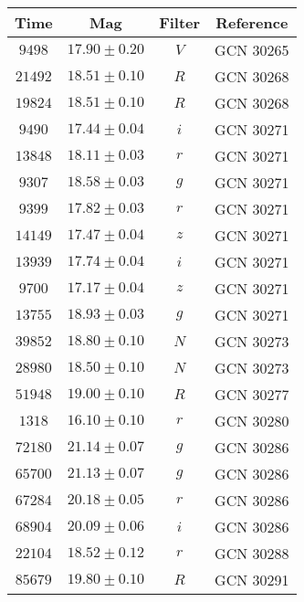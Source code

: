 \documentclass{naturesubmissionstyle}
\begin{document}

\begin{table}
\centering
\begin{tabular}{cccc}

Time & Mag & Filter & Reference \\
\hline
$9498$ & $17.90\pm0.20$ & $V$ & GCN 30265\cite{gcn_30265} \\
$21492$ & $18.51\pm0.10$ & $R$ & GCN 30268\cite{gcn_30268} \\
$19824$ & $18.51\pm0.10$ & $R$ & GCN 30268\cite{gcn_30268} \\
$9490$ & $17.44\pm0.04$ & $i$ & GCN 30271\cite{gcn_30271} \\
$13848$ & $18.11\pm0.03$ & $r$ & GCN 30271\cite{gcn_30271} \\
$9307$ & $18.58\pm0.03$ & $g$ & GCN 30271\cite{gcn_30271} \\
$9399$ & $17.82\pm0.03$ & $r$ & GCN 30271\cite{gcn_30271} \\
$14149$ & $17.47\pm0.04$ & $z$ & GCN 30271\cite{gcn_30271} \\
$13939$ & $17.74\pm0.04$ & $i$ & GCN 30271\cite{gcn_30271} \\
$9700$ & $17.17\pm0.04$ & $z$ & GCN 30271\cite{gcn_30271} \\
$13755$ & $18.93\pm0.03$ & $g$ & GCN 30271\cite{gcn_30271} \\
$39852$ & $18.80\pm0.10$ & $N$ & GCN 30273\cite{gcn_30273} \\
$28980$ & $18.50\pm0.10$ & $N$ & GCN 30273\cite{gcn_30273} \\
$51948$ & $19.00\pm0.10$ & $R$ & GCN 30277\cite{gcn_30277} \\
$1318$ & $16.10\pm0.10$ & $r$ & GCN 30280\cite{gcn_30280} \\
$72180$ & $21.14\pm0.07$ & $g$ & GCN 30286\cite{gcn_30286} \\
$65700$ & $21.13\pm0.07$ & $g$ & GCN 30286\cite{gcn_30286} \\
$67284$ & $20.18\pm0.05$ & $r$ & GCN 30286\cite{gcn_30286} \\
$68904$ & $20.09\pm0.06$ & $i$ & GCN 30286\cite{gcn_30286} \\
$22104$ & $18.52\pm0.12$ & $r$ & GCN 30288\cite{gcn_30288} \\
$85679$ & $19.80\pm0.10$ & $R$ & GCN 30291\cite{gcn_30291} \\

\end{tabular}
\end{table}
\end{document}
